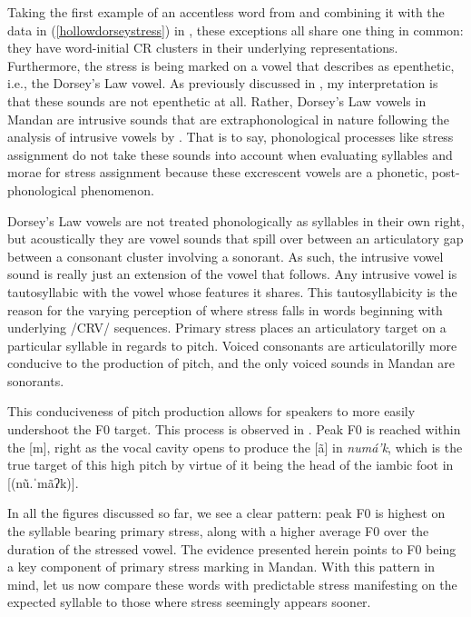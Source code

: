 Taking the first example of an accentless word from \citet{kennard1936} and combining it with the data in (\ref{hollowdorseystress}) in \citet{hollow1970}, these exceptions all share one thing in common: they have word-initial CR clusters in their underlying representations. Furthermore, the stress is being marked on a vowel that \citet{hollow1970} describes as epenthetic, i.e., the Dorsey's Law vowel. As previously discussed in , my interpretation is that these sounds are not epenthetic at all. Rather, Dorsey's Law vowels in Mandan are intrusive sounds that are extraphonological in nature following the analysis of intrusive vowels by \citet{hall2006}. That is to say, phonological processes like stress assignment do not take these sounds into account when evaluating syllables and morae for stress assignment because these excrescent vowels are a phonetic, post-phonological phenomenon.

Dorsey's Law vowels are not treated phonologically as syllables in their own right, but acoustically they are vowel sounds that spill over between an articulatory gap between a consonant cluster involving a sonorant. As such, the intrusive vowel sound is really just an extension of the vowel that follows. Any intrusive vowel is tautosyllabic with the vowel whose features it shares. This tautosyllabicity is the reason for the varying perception of where stress falls in words beginning with underlying /CRV/ sequences. Primary stress places an articulatory target on a particular syllable in regards to pitch. Voiced consonants are articulatorilly more conducive to the production of pitch, and the only voiced sounds in Mandan are sonorants.

This conduciveness of pitch production allows for speakers to more easily undershoot the F0 target. This process is observed in . Peak F0 is reached within the [m], right as the vocal cavity opens to produce the [ã] in \textit{numá'k}, which is the true target of this high pitch by virtue of it being the head of the iambic foot in [(nũ.ˈmãʔk)].

In all the figures discussed so far, we see a clear pattern: peak F0 is highest on the syllable bearing primary stress, along with a higher average F0 over the duration of the stressed vowel. The evidence presented herein points to F0 being a key component of primary stress marking in Mandan. With this pattern in mind, let us now compare these words with predictable stress manifesting on the expected syllable to those where stress seemingly appears sooner.

